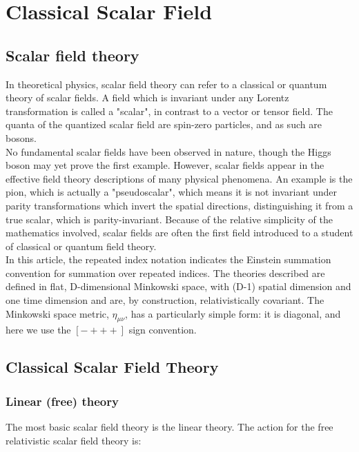 \chapter{Classical Scalar Field}
\label{ch:classicalscalarfield}

\section{Scalar field theory}

In theoretical physics, scalar field theory can refer to a classical or quantum theory of scalar fields. A field which is invariant under any Lorentz transformation is called a "scalar", in contrast to a vector or tensor field. The quanta of the quantized scalar field are spin-zero particles, and as such are bosons. \\

No fundamental scalar fields have been observed in nature, though the Higgs boson may yet prove the first example. However, scalar fields appear in the effective field theory descriptions of many physical phenomena. An example is the pion, which is actually a "pseudoscalar", which means it is not invariant under parity transformations which invert the spatial directions, distinguishing it from a true scalar, which is parity-invariant. Because of the relative simplicity of the mathematics involved, scalar fields are often the first field introduced to a student of classical or quantum field theory.\\

In this article, the repeated index notation indicates the Einstein summation convention for summation over repeated indices. The theories described are defined in flat, D-dimensional Minkowski space, with (D-1) spatial dimension and one time dimension and are, by construction, relativistically covariant. The Minkowski space metric, $\eta_{\mu\nu}$, has a particularly simple form: it is diagonal, and here we use the $[- + + +]$ sign convention.\\

\section{Classical Scalar Field Theory}

\subsection{Linear (free) theory}

The most basic scalar field theory is the linear theory. The action for the free relativistic scalar field theory is:\\

